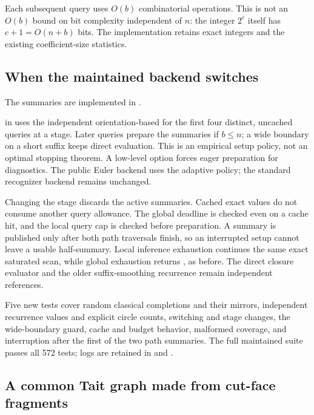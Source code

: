 Each subsequent query uses $O(b)$ combinatorial operations.  This is not
an $O(b)$ bound on bit complexity independent of $n$: the integer $2^c$ itself
has $c+1=O(n+b)$ bits.  The implementation retains exact integers and the
existing coefficient-size statistics.

\subsection{When the maintained backend switches}

The summaries are implemented in
.

 in  uses the
independent orientation-based  for the first four distinct,
uncached queries at a stage.  Later queries prepare the summaries if $b\le n$;
a wide boundary on a short suffix keeps direct evaluation.  This is an
empirical setup policy, not an optimal stopping theorem.  A low-level
 option forces eager preparation for diagnostics.
The public Euler backend uses the adaptive policy; the standard recognizer
backend remains unchanged.

Changing the stage discards the active summaries.  Cached exact values do
not consume another query allowance.  The global deadline is checked even
on a cache hit, and the local query cap is checked before preparation.
A summary is published only after both path traversals finish, so an
interrupted setup cannot leave a usable half-summary.  Local inference
exhaustion continues the same exact saturated scan, while global exhaustion
returns , as before.  The direct closure evaluator and the
older suffix-smoothing recurrence remain independent references.

Five new tests cover random classical completions and their mirrors,
independent recurrence values and explicit circle counts, switching and
stage changes, the wide-boundary guard, cache and budget behavior, malformed
coverage, and interruption after the first of the two path summaries.
The full maintained suite passes all 572 tests; logs are retained in
 and
.

\subsection{A common Tait graph made from cut-face fragments}


